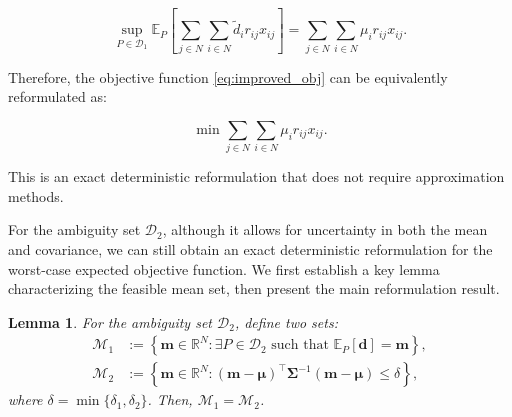 \documentclass[preprint,12pt,authoryear]{elsarticle}
\newtheorem{lemma}{Lemma}
\begin{document}
\begin{equation}
\sup_{P \in \mathcal{D}_1} \mathbb{E}_P\left[\sum_{j \in N} \sum_{i \in N} \widetilde{d}_i r_{ij} x_{ij}\right] = \sum_{j \in N} \sum_{i \in N} \mu_i r_{ij} x_{ij}.
\end{equation}

Therefore, the objective function \eqref{eq:improved_obj} can be equivalently reformulated as:

\begin{equation}
\min \sum_{j \in N} \sum_{i \in N} \mu_i r_{ij} x_{ij}. \label{eq:improved_obj_d1}
\end{equation}

This is an exact deterministic reformulation that does not require approximation methods.

For the ambiguity set $\mathcal{D}_2$, although it allows for uncertainty in both the mean and covariance, we can still obtain an exact deterministic reformulation for the worst-case expected objective function. We first establish a key lemma characterizing the feasible mean set, then present the main reformulation result.

\begin{lemma}\label{lem:d2_feasible_mean}
For the ambiguity set $\mathcal{D}_2$, define two sets:
\begin{align}
\mathcal{M}_1 &:= \left\{ \mathbf{m} \in \mathbb{R}^N : \exists P \in \mathcal{D}_2 \text{ such that } \mathbb{E}_P[\mathbf{d}] = \mathbf{m} \right\}, \label{eq:M1} \\
\mathcal{M}_2 &:= \left\{ \mathbf{m} \in \mathbb{R}^N : (\mathbf{m} - \boldsymbol{\mu})^\top \boldsymbol{\Sigma}^{-1} (\mathbf{m} - \boldsymbol{\mu}) \leqslant \delta \right\}, \label{eq:M2}
\end{align}
where $\delta = \min\{\delta_1, \delta_2\}$. Then, $\mathcal{M}_1 = \mathcal{M}_2$.
\end{lemma}
\end{document}
